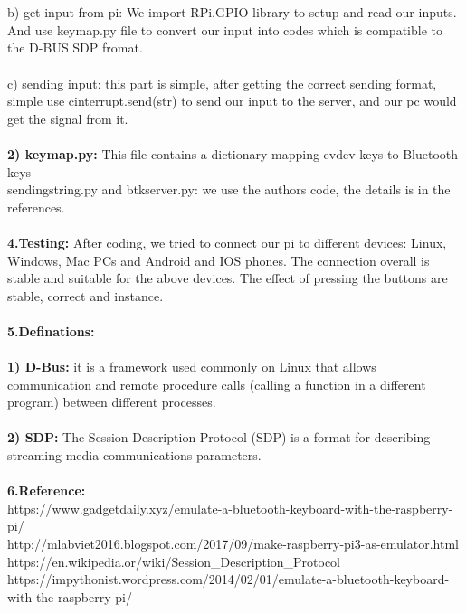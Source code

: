 \documentclass[a4paper]{article}
\begin{document}
\\\\
b) get input from pi: We import RPi.GPIO library to setup and read our inputs. And use keymap.py file to convert our input into codes which is compatible to the D-BUS SDP fromat.
\\\\
c) sending input:	this part is simple, after getting the correct sending format, simple use cinterrupt.send(str) to send our input to the server, and our pc would get the signal from it.
\\\\
\textbf{2) keymap.py:} This file contains a dictionary mapping evdev keys to Bluetooth keys \\
sendingstring.py and btkserver.py: we use the authors code, the details is in the references.
\\\\
\textbf{4.Testing:} After coding, we tried to connect our pi to different devices: Linux, Windows, Mac PCs and Android and IOS phones. The connection overall is stable and suitable for the above devices. The effect of pressing the buttons are stable, correct and instance.
\\\\
\textbf{5.Definations:} \\\\
\textbf{1) D-Bus:} it is a framework used commonly on Linux that allows communication and remote procedure calls (calling a function in a different program) between different processes. \\\\
\textbf{2) SDP:} The Session Description Protocol (SDP) is a format for describing streaming media communications parameters. 
\\\\
\textbf{6.Reference:}\\
https://www.gadgetdaily.xyz/emulate-a-bluetooth-keyboard-with-the-raspberry-pi/\\
http://mlabviet2016.blogspot.com/2017/09/make-raspberry-pi3-as-emulator.html\\
https://en.wikipedia.or/wiki/Session\_Description\_Protocol\\
https://impythonist.wordpress.com/2014/02/01/emulate-a-bluetooth-keyboard-with-the-raspberry-pi/\\
\end{document}
